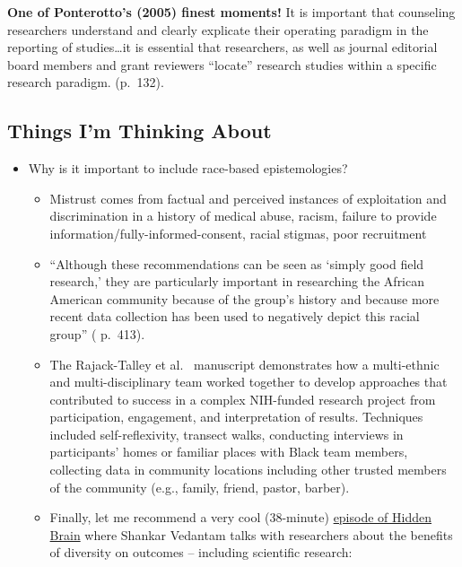 \documentclass[
  english,
]{book}
\providecommand{\tightlist}{%
  \setlength{\itemsep}{0pt}\setlength{\parskip}{0pt}}
\begin{document}
\textbf{One of Ponterotto's (2005) finest moments!}
It is important that counseling researchers understand and clearly explicate their operating paradigm in the reporting of studies\ldots it is essential that researchers, as well as journal editorial board members and grant reviewers ``locate'' research studies within a specific research paradigm. (p.~132).

\hypertarget{things-im-thinking-about}{%
\subsection{Things I'm Thinking About}\label{things-im-thinking-about}}

\begin{itemize}
\tightlist
\item
  Why is it important to include race-based epistemologies?

  \begin{itemize}
  \tightlist
  \item
    Mistrust comes from factual and perceived instances of exploitation and discrimination in a history of medical abuse, racism, failure to provide information/fully-informed-consent, racial stigmas, poor recruitment \citep{rajack-talley_epistemological_2017}
  \item
    ``Although these recommendations can be seen as `simply good field research,' they are particularly important in researching the African American community because of the group's history and because more recent data collection has been used to negatively depict this racial group'' (\citep{rajack-talley_epistemological_2017} p.~413).
  \item
    The Rajack-Talley et al.~\citeyearpar{rajack-talley_epistemological_2017} manuscript demonstrates how a multi-ethnic and multi-disciplinary team worked together to develop approaches that contributed to success in a complex NIH-funded research project from participation, engagement, and interpretation of results. Techniques included self-reflexivity, transect walks, conducting interviews in participants' homes or familiar places with Black team members, collecting data in community locations including other trusted members of the community (e.g., family, friend, pastor, barber).
  \item
    Finally, let me recommend a very cool (38-minute) \href{https://www.npr.org/2020/07/27/895858974/creativity-and-diversity-how-exposure-to-different-people-affects-our-thinking}{episode of Hidden Brain} where Shankar Vedantam talks with researchers about the benefits of diversity on outcomes -- including scientific research:
  \end{itemize}
\end{itemize}
\end{document}
